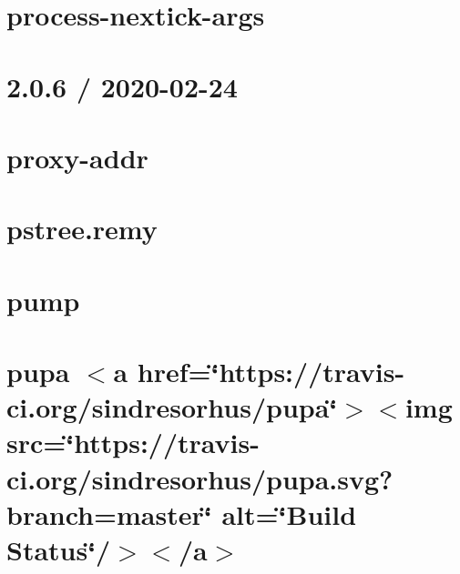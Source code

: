 \let\mypdfximage\pdfximage\def\pdfximage{\immediate\mypdfximage}\documentclass[twoside]{book}
\newcommand{\+}{\discretionary{\mbox{\scriptsize$\hookleftarrow$}}{}{}}
\begin{document}
\chapter{process-\/nextick-\/args}
\label{md__c_1__git_hub__p_r_o_y_e_c_t_o-_i_i_i-_g_o_t_rest-api_node_modules_process-nextick-args_readme}

\chapter{2.0.6 / 2020-\/02-\/24}
\label{md__c_1__git_hub__p_r_o_y_e_c_t_o-_i_i_i-_g_o_t_rest-api_node_modules_proxy-addr__h_i_s_t_o_r_y}

\chapter{proxy-\/addr}
\label{md__c_1__git_hub__p_r_o_y_e_c_t_o-_i_i_i-_g_o_t_rest-api_node_modules_proxy-addr__r_e_a_d_m_e}

\chapter{pstree.\+remy}
\label{md__c_1__git_hub__p_r_o_y_e_c_t_o-_i_i_i-_g_o_t_rest-api_node_modules_pstree_8remy__r_e_a_d_m_e}

\chapter{pump}
\label{md__c_1__git_hub__p_r_o_y_e_c_t_o-_i_i_i-_g_o_t_rest-api_node_modules_pump__r_e_a_d_m_e}

\chapter{pupa $<$a href=\char`\"{}https\+://travis-\/ci.\+org/sindresorhus/pupa\char`\"{}$>$$<$img src=\char`\"{}https\+://travis-\/ci.\+org/sindresorhus/pupa.\+svg?branch=master\char`\"{} alt=\char`\"{}\+Build Status\char`\"{}/$>$$<$/a$>$}
\label{md__c_1__git_hub__p_r_o_y_e_c_t_o-_i_i_i-_g_o_t_rest-api_node_modules_pupa_readme}

\end{document}
